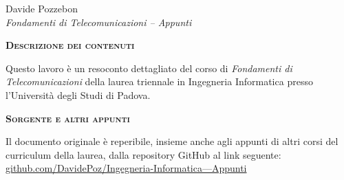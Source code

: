 \thispagestyle{empty} %

\vspace*{5cm}
\begin{center}
    {\large Davide Pozzebon}\\[0.5cm]
    {\itshape Fondamenti di Telecomunicazioni -- Appunti}\\[0.5cm]
\end{center}

\vspace*{\fill}

\noindent \textbf{\textsc{Descrizione dei contenuti}}

\vspace{0.5em}
\noindent \small
Questo lavoro è un resoconto dettagliato del corso di \textit{Fondamenti di Telecomunicazioni}
della laurea triennale in Ingegneria Informatica presso l'Università degli Studi di Padova.

\vspace{1.5em}
\noindent \textbf{\textsc{Sorgente e altri appunti}}

\vspace{0.5em}
\noindent \small
Il documento originale è reperibile, insieme anche agli appunti di altri corsi del
curriculum della laurea, dalla repository GitHub al link seguente:
\href{https://github.com/DavidePoz/Ingegneria-Informatica---Appunti.git}
     {github.com/DavidePoz/Ingegneria-Informatica---Appunti}

\vspace*{1cm}
